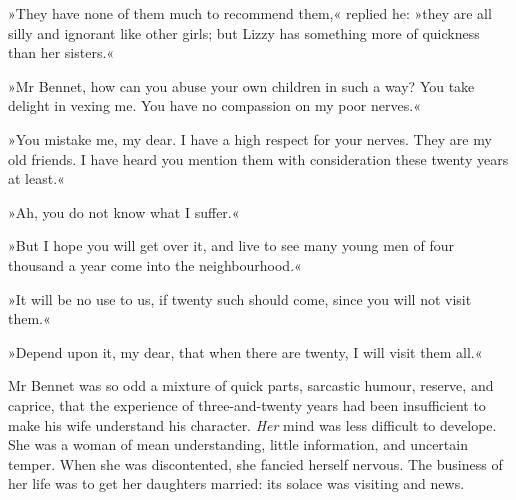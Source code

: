 »They have none of them much to recommend them,« replied he: »they are all silly and ignorant like other girls; but Lizzy has something more of quickness than her sisters.«

»Mr Bennet, how can you abuse your own children in such a way? You take delight in vexing me. You have no compassion on my poor nerves.«

»You mistake me, my dear. I have a high respect for your nerves. They are my old friends. I have heard you mention them with consideration these twenty years at least.«

»Ah, you do not know what I suffer.«

»But I hope you will get over it, and live to see many young men of four thousand a year come into the neighbourhood.«

»It will be no use to us, if twenty such should come, since you will not visit them.«

»Depend upon it, my dear, that when there are twenty, I will visit them all.«

Mr Bennet was so odd a mixture of quick parts, sarcastic humour, reserve, and caprice, that the experience of three-and-twenty years had been insufficient to make his wife understand his character. \textit{Her} mind was less difficult to develope. She was a woman of mean understanding, little information, and uncertain temper. When she was discontented, she fancied herself nervous. The business of her life was to get her daughters married: its solace was visiting and news.

